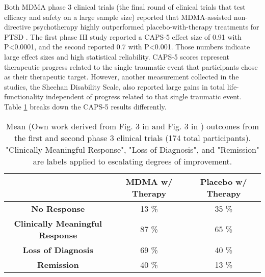 \documentclass[12pt,letterpaper]{book}
\begin{document}
Both MDMA phase 3 clinical trials (the final round of clinical trials that test efficacy and safety on a large sample size) reported that MDMA-assisted non-directive psychotherapy highly outperformed placebo-with-therapy treatments for PTSD \cite{mitchellMDMAClinicalTrial,mitchellMDMAClinicalTrial2}. The first phase III study reported a CAPS-5 effect size of 0.91 with P<0.0001, and the second reported 0.7 with P<0.001. Those numbers indicate large effect sizes and high statistical reliability. CAPS-5 scores represent therapeutic progress related to the single traumatic event that participants chose as their therapeutic target. However, another measurement collected in the studies, the Sheehan Disability Scale, also reported large gains in total life-functionality independent of progress related to that single traumatic event. Table \ref{table:efficacy} breaks down the CAPS-5 results differently.
\FloatBarrier
\begin{table}[htbp]
    \centering
    \caption{Mean (Own work derived from Fig. 3 in \textcite{mitchellMDMAClinicalTrial} and Fig. 3 in \textcite{mitchellMDMAClinicalTrial2}) outcomes from the first and second phase 3 clinical trials (174 total participants). "Clinically Meaningful Response", "Loss of Diagnosis", and "Remission" are labels applied to escalating degrees of improvement.}
    \label{table:efficacy}
    \begin{tabular}{|c|c|c|}
    \hline
     & \textbf{MDMA w/ Therapy} & \textbf{Placebo w/ Therapy} \\ \hline
    \textbf{No Response}          & 13 \%          & 35 \%          \\ \hline
    \textbf{Clinically Meaningful Response}          & 87 \%          & 65 \%         \\ \hline
    \textbf{Loss of Diagnosis} & 69 \% & 40 \% \\ \hline
    \textbf{Remission}          & 40 \%          & 13 \%          \\ \hline
    \end{tabular}
\end{table}
\FloatBarrier
\end{document}
